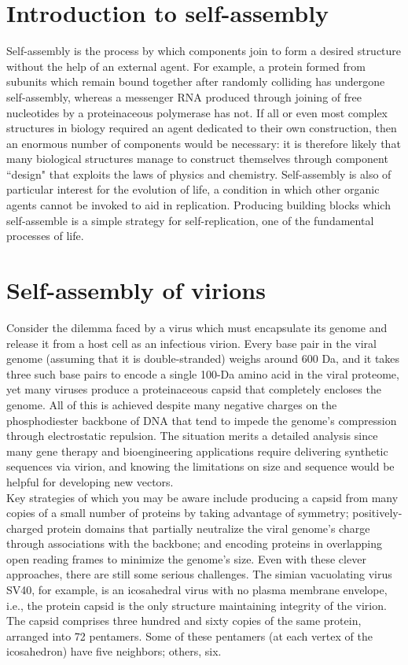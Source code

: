 \documentclass{article}
\begin{document}
\large

\section*{Introduction to self-assembly}

Self-assembly is the process by which components join to form a desired structure without the help of an external agent. For example, a protein formed from subunits which remain bound together after randomly colliding has undergone self-assembly, whereas a messenger RNA produced through joining of free nucleotides by a proteinaceous polymerase has not. If all or even most complex structures in biology required an agent dedicated to their own construction, then an enormous number of components would be necessary: it is therefore likely that many biological structures manage to construct themselves through component ``design" that exploits the laws of physics and chemistry. Self-assembly is also of particular interest for the evolution of life, a condition in which other organic agents cannot be invoked to aid in replication. Producing building blocks which self-assemble is a simple strategy for self-replication, one of the fundamental processes of life.

\section*{Self-assembly of virions}

Consider the dilemma faced by a virus which must encapsulate its genome and release it from a host cell as an infectious virion. Every base pair in the viral genome (assuming that it is double-stranded) weighs around 600 Da, and it takes three such base pairs to encode a single 100-Da amino acid in the viral proteome, yet many viruses produce a proteinaceous capsid that completely encloses the genome. All of this is achieved despite many negative charges on the phosphodiester backbone of DNA that tend to impede the genome's compression through electrostatic repulsion. The situation merits a detailed analysis since many gene therapy and bioengineering applications require delivering synthetic sequences via virion, and knowing the limitations on size and sequence would be helpful for developing new vectors.\\

Key strategies of which you may be aware include producing a capsid from many copies of a small number of proteins by taking advantage of symmetry; positively-charged protein domains that partially neutralize the viral genome's charge through associations with the backbone; and encoding proteins in overlapping open reading frames to minimize the genome's size. Even with these clever approaches, there are still some serious challenges. The simian vacuolating virus SV40, for example, is an icosahedral virus with no plasma membrane envelope, i.e., the protein capsid is the only structure maintaining integrity of the virion. The capsid comprises three hundred and sixty copies of the same protein, arranged into 72 pentamers. Some of these pentamers (at each vertex of the icosahedron) have five neighbors; others, six.
\end{document}
